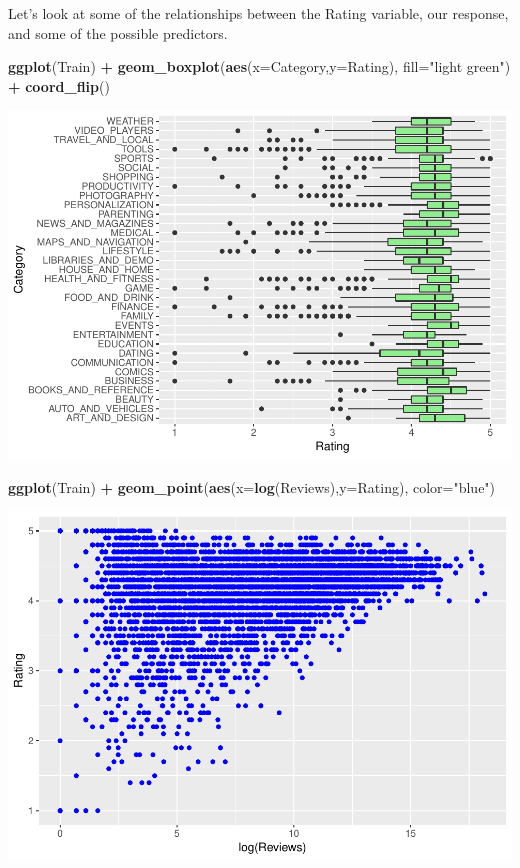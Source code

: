\documentclass[]{article}
\newenvironment{Shaded}{\begin{snugshade}}{\end{snugshade}}
\newcommand{\DataTypeTok}[1]{\textcolor[rgb]{0.13,0.29,0.53}{#1}}
\newcommand{\KeywordTok}[1]{\textcolor[rgb]{0.13,0.29,0.53}{\textbf{#1}}}
\newcommand{\NormalTok}[1]{#1}
\newcommand{\OperatorTok}[1]{\textcolor[rgb]{0.81,0.36,0.00}{\textbf{#1}}}
\newcommand{\StringTok}[1]{\textcolor[rgb]{0.31,0.60,0.02}{#1}}
\begin{document}
Let's look at some of the relationships between the Rating variable, our
response, and some of the possible predictors.

\begin{Shaded}
\begin{Highlighting}[]
\KeywordTok{ggplot}\NormalTok{(Train) }\OperatorTok{+}\StringTok{ }\KeywordTok{geom_boxplot}\NormalTok{(}\KeywordTok{aes}\NormalTok{(}\DataTypeTok{x=}\NormalTok{Category,}\DataTypeTok{y=}\NormalTok{Rating), }\DataTypeTok{fill=}\StringTok{"light green"}\NormalTok{) }\OperatorTok{+}\StringTok{ }\KeywordTok{coord_flip}\NormalTok{()}
\end{Highlighting}
\end{Shaded}

\includegraphics{Project_2_Work_files/figure-latex/unnamed-chunk-16-1.pdf}

\begin{Shaded}
\begin{Highlighting}[]
\KeywordTok{ggplot}\NormalTok{(Train) }\OperatorTok{+}\StringTok{ }\KeywordTok{geom_point}\NormalTok{(}\KeywordTok{aes}\NormalTok{(}\DataTypeTok{x=}\KeywordTok{log}\NormalTok{(Reviews),}\DataTypeTok{y=}\NormalTok{Rating), }\DataTypeTok{color=}\StringTok{"blue"}\NormalTok{)}
\end{Highlighting}
\end{Shaded}

\includegraphics{Project_2_Work_files/figure-latex/unnamed-chunk-16-2.pdf}
\end{document}
